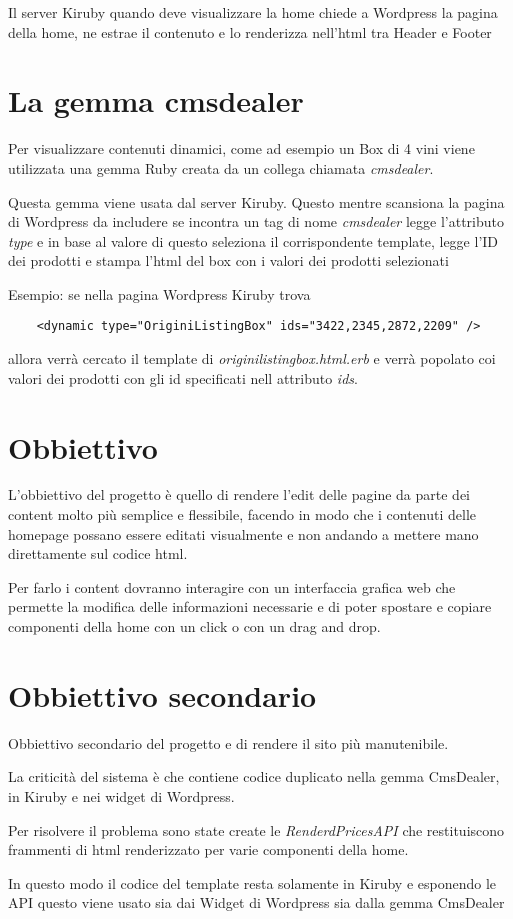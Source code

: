 Il server Kiruby quando deve visualizzare la home chiede a Wordpress la pagina della home, ne estrae
il contenuto e lo renderizza nell'html tra Header e Footer

\section{La gemma cmsdealer}
Per visualizzare contenuti dinamici, come ad esempio un Box di 4 vini viene utilizzata
una gemma Ruby creata da un collega chiamata \emph{cmsdealer}.

Questa gemma viene usata dal server Kiruby. Questo mentre scansiona la pagina di Wordpress da includere
se incontra un tag di nome \emph{cmsdealer} legge l'attributo \emph{type} e in base al valore di questo
seleziona il corrispondente template, legge l'ID dei prodotti e stampa l'html del box con
i valori dei prodotti selezionati

Esempio: se nella pagina Wordpress Kiruby trova
\begin{verbatim}
	<dynamic type="OriginiListingBox" ids="3422,2345,2872,2209" />
\end{verbatim}
allora verrà cercato il template di \emph{originilistingbox.html.erb} e verrà popolato
coi valori dei prodotti con gli id specificati nell attributo \emph{ids}.


\newpage
\section{Obbiettivo}
L'obbiettivo del progetto è quello di rendere l'edit delle pagine
da parte dei content molto più semplice e flessibile,
facendo in modo che i contenuti delle homepage possano essere editati visualmente e non
andando a mettere mano direttamente sul codice html.

Per farlo i content dovranno interagire con un interfaccia grafica web che permette
la modifica delle informazioni necessarie e di poter spostare e copiare
componenti della home con un click o con un drag and drop.

\section{Obbiettivo secondario}
Obbiettivo secondario del progetto e di rendere il sito più manutenibile.

La criticità del sistema è che contiene codice duplicato nella gemma CmsDealer, in Kiruby
e nei widget di Wordpress. 

Per risolvere il problema sono state create le  \emph{RenderdPricesAPI} 
che restituiscono frammenti di html renderizzato per varie componenti della home.

In questo modo il codice del template resta solamente in Kiruby e esponendo le 
API questo viene usato sia dai Widget di Wordpress sia dalla gemma CmsDealer

